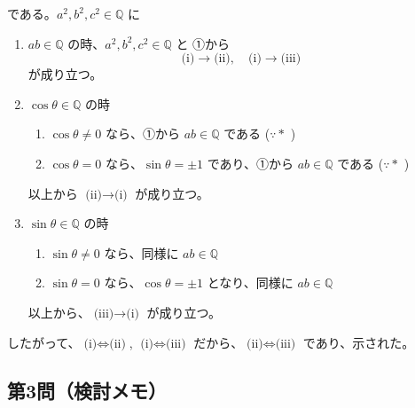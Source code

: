 \documentclass[../main.tex]{subfiles}
\begin{document}
である。$a^2, b^2, c^2 \in \mathbb{Q}$ に

\begin{enumerate}
  \item[(i)] $ab \in \mathbb{Q}$ の時、$a^2, b^2, c^2 \in \mathbb{Q}$ と ①から
    \[
      \text{(i)} \to \text{(ii)}, \quad \text{(i)} \to \text{(iii)}
    \]
    が成り立つ。

  \item[(ii)] $\cos\theta \in \mathbb{Q}$ の時
    \begin{enumerate}
      \item[(A)] $\cos\theta \neq 0$ なら、①から $ab \in \mathbb{Q}$ である ($\because *$ )
      \item[(B)] $\cos\theta = 0$ なら、$\sin\theta = \pm 1$ であり、①から $ab \in \mathbb{Q}$ である ($\because *$ )
    \end{enumerate}
    以上から $\text{(ii)} \to \text{(i)}$ が成り立つ。

  \item[(iii)] $\sin\theta \in \mathbb{Q}$ の時
    \begin{enumerate}
      \item[(A)] $\sin\theta \neq 0$ なら、同様に $ab \in \mathbb{Q}$
      \item[(B)] $\sin\theta = 0$ なら、$\cos\theta = \pm 1$ となり、同様に $ab \in \mathbb{Q}$
    \end{enumerate}
    以上から、$\text{(iii)} \to \text{(i)}$ が成り立つ。
\end{enumerate}

したがって、$\text{(i)} \iff \text{(ii)}$, $\text{(i)} \iff \text{(iii)}$ だから、$\text{(ii)} \iff \text{(iii)}$ であり、示された。

\newpage

\subsection*{第3問（検討メモ）}


\newpage

\end{document}
